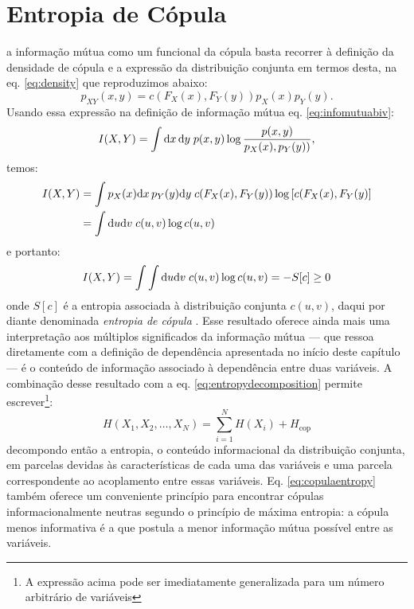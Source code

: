 \section{Entropia de Cópula}
\label{sec:copentropy}
 a informação mútua como um funcional da cópula basta recorrer à definição da densidade de cópula e a expressão da distribuição conjunta 
em termos desta, na eq. \eqref{eq:density} que reproduzimos abaixo:
\begin{equation*}
p_{XY}(x,y) = c(F_X(x), F_Y(y)) p_X(x) p_Y(y).
\end{equation*}
Usando essa expressão na definição de informação mútua eq. \eqref{eq:infomutuabiv}:
\begin{equation*}
 I(X,Y) = \int \mathrm{d} x\,\mathrm{d} y\; p(x, y) \log \frac{p(x, y)}{p_{X}(x),p_{Y}(y))},
\end{equation*}
temos:
\begin{align*}
 I(X,Y) &= \int p_X(x) \mathrm{d} x\, p_Y(y)\mathrm{d} y\; c(F_X(x), F_Y(y)) \log \left[c(F_X(x), F_Y(y)\right] \\&= \int \mathrm{d} u \mathrm{d} v\; c(u,v) \log c(u,v)
\end{align*}
e portanto:
\begin{equation}
\label{eq:copulaentropy}
I(X,Y) = \int \int \ud u \ud v \; c(u,v) \log c(u,v)  = - S[c] \ge 0
\end{equation}
onde $S[c]$ é a entropia associada à distribuição conjunta $c(u,v)$, daqui por diante denominada \textit{entropia de cópula} \cite{Ma2008,Jenison2004}.
Esse resultado oferece ainda mais uma interpretação aos múltiplos significados da informação mútua --- que ressoa diretamente com a definição de dependência apresentada no início deste capítulo --- é o conteúdo de informação associado à dependência entre duas variáveis. A combinação desse resultado com a eq. \eqref{eq:entropydecomposition} permite escrever\footnote{A expressão acima pode ser imediatamente generalizada para um número arbitrário de variáveis}:
\begin{equation}
\label{eq:entropydecomposition2}
H(X_1, X_2, \ldots, X_N) = \sum_{i=1}^{N} H(X_i) + H_{\mbox{cop}} 
\end{equation}
decompondo então a entropia, o conteúdo informacional da distribuição conjunta, em parcelas devidas às características de cada uma das variáveis e uma parcela correspondente ao acoplamento entre essas variáveis. Eq. \eqref{eq:copulaentropy} também oferece um conveniente princípio para encontrar cópulas informacionalmente neutras segundo o princípio de máxima entropia\cite{Jaynes2003}: a cópula menos informativa é a que postula a menor informação mútua possível entre as variáveis. 


